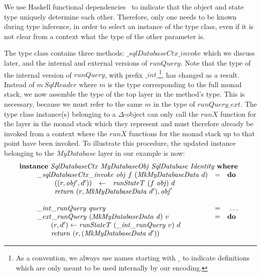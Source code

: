 We use Haskell functional dependencies~\cite{jones2000type} to indicate that the object and state type uniquely determine each other. Therefore, only one needs to be known during type inference, in order to select an instance of the type class, even if it is not clear from a context what the type of the other parameter is.

The type class contains three methods: $\mathit{\_sqlDatabaseCtx\_invoke}$ which we discuss later, and the internal and external versions of $\mathit{runQuery}$. Note that the type of the internal version of $\mathit{runQuery}$, with prefix $\_\mathit{int}\_$\footnote{As a convention, we always use names starting with $\_$ to indicate definitions which are only meant to be used internally by our encoding.}, has changed as a result. Instead of $m~\mathit{SqlReader}$ where $m$ is the type corresponding to the full monad stack, we now assemble the type of the top layer in the method's type. This is necessary, because we must refer to the same $m$ in the type of $\mathit{runQuery\_ext}$. The type class instance(s) belonging to a $\Delta$-object can only call the $\mathit{runX}$ function for the layer in the monad stack which they represent and must therefore already be invoked from a context where the $\mathit{runX}$ functions for the monad stack up to that point have been invoked. To illustrate this procedure, the updated instance belonging to the $\mathit{MyDatabase}$ layer in our example is now:
\begin{displaymath}
\begin{array}{l}
\mathbf{instance}~\mathit{SqlDatabaseCtx}~\mathit{MyDatabaseObj}~\mathit{SqlDatabase}~\mathit{Identity}~\mathbf{where}\\
\qquad \begin{array}{lcl}
\mathit{\_\mathit{sqlDatabaseCtx\_invoke}}~\mathit{obj}~f~(\mathit{MkMyDatabaseData}~d) & = & \mathbf{do}\\
\multicolumn{3}{l}{\qquad \begin{array}{lcl}
((r, \mathit{obj'}, d')) & \leftarrow & \mathit{runStateT}~(f~\mathit{obj})~d \\
\multicolumn{3}{l}{\mathit{return}~(r, \mathit{MkMyDatabaseData}~d'), \mathit{obj}'}
\end{array}}
\\\\
\mathit{\_int\_runQuery}~\mathit{query} & = & ~\ldots \\
\mathit{\_ext\_runQuery}~(\mathit{MkMyDatabaseData}~\mathit{d})~v & = & \mathbf{do} \\
\multicolumn{3}{l}{\qquad (r,d') \leftarrow \mathit{runStateT}~(\mathit{\_int\_runQuery}~v)~d } \\ 
\multicolumn{3}{l}{\qquad \mathit{return}~(r, (\mathit{MkMyDatabaseData}~d')) } 
\end{array}
\end{array}
\end{displaymath}
